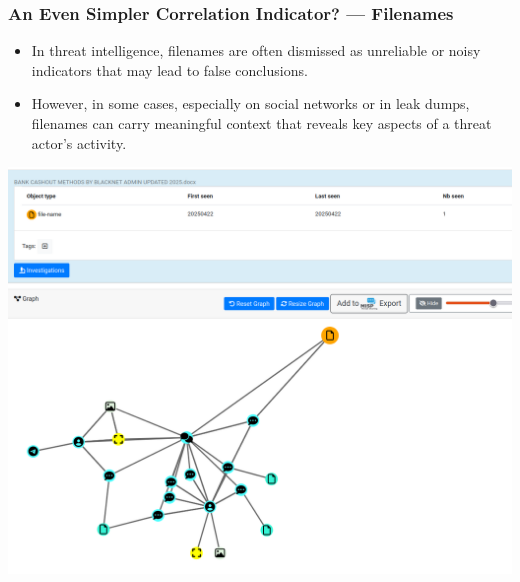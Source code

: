 \documentclass[10pt,aspectratio=169, colorlinks=true, linkcolor=circlBlue]{beamer}
\begin{document}
\begin{frame}
    \frametitle{An Even Simpler Correlation Indicator? — Filenames}
    \begin{itemize}
        \item In threat intelligence, filenames are often dismissed as unreliable or noisy indicators that may lead to false conclusions.
        \item However, in some cases, especially on social networks or in leak dumps, filenames can carry meaningful context that reveals key aspects of a threat actor's activity.
    \end{itemize}
    \begin{center}
        \includegraphics[scale=0.15]{./img/filename.png}
    \end{center}
\end{frame}
\end{document}
